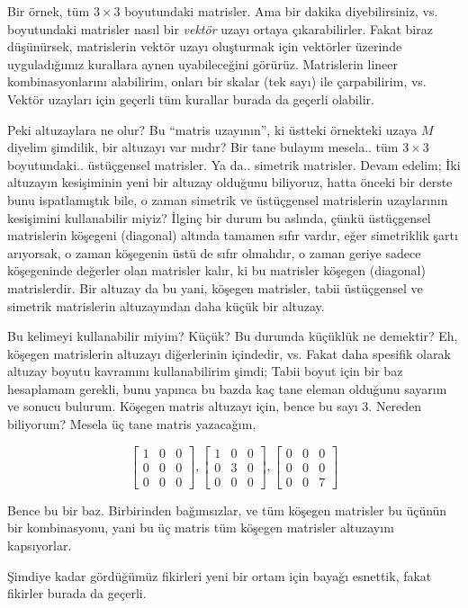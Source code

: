 \documentclass[12pt,fleqn]{article}\usepackage{../../common}
\begin{document}
Bir örnek, tüm $3 \times 3$ boyutundaki matrisler. Ama bir dakika
diyebilirsiniz, vs. boyutundaki matrisler nasıl bir {\em vektör} uzayı
ortaya çıkarabilirler. Fakat biraz düşünürsek, matrislerin vektör uzayı
oluşturmak için vektörler üzerinde uyguladığımız kurallara aynen
uyabileceğini görürüz. Matrislerin lineer kombinasyonlarını alabilirim,
onları bir skalar (tek sayı) ile çarpabilirim, vs. Vektör uzayları için
geçerli tüm kurallar burada da geçerli olabilir. 

Peki altuzaylara ne olur? Bu ``matris uzayının'', ki üstteki örnekteki
uzaya $M$ diyelim şimdilik, bir altuzayı var mıdır? Bir tane bulayım
mesela.. tüm $3 \times 3$ boyutundaki.. üstüçgensel matrisler. Ya da..
simetrik matrisler. Devam edelim; İki altuzayın kesişiminin yeni bir
altuzay olduğunu biliyoruz, hatta önceki bir derste bunu ispatlamıştık
bile, o zaman simetrik ve üstüçgensel matrislerin uzaylarının kesişimini
kullanabilir miyiz? İlginç bir durum bu aslında, çünkü üstüçgensel
matrislerin köşegeni (diagonal) altında tamamen sıfır vardır, eğer
simetriklik şartı arıyorsak, o zaman köşegenin üstü de sıfır olmalıdır, o
zaman geriye sadece köşegeninde değerler olan matrisler kalır, ki bu
matrisler köşegen (diagonal) matrislerdir. Bir altuzay da bu yani, köşegen
matrisler, tabii üstüçgensel ve simetrik matrislerin altuzayından daha
küçük bir altuzay. 

Bu kelimeyi kullanabilir miyim? Küçük? Bu durumda küçüklük ne demektir? Eh,
köşegen matrislerin altuzayı diğerlerinin içindedir, vs. Fakat daha
spesifik olarak altuzay boyutu kavramını kullanabilirim şimdi; Tabii boyut
için bir baz hesaplamam gerekli, bunu yapınca bu bazda kaç tane eleman
olduğunu sayarım ve sonucu bulurum. Köşegen matris altuzayı için, bence bu
sayı 3. Nereden biliyorum? Mesela üç tane matris yazacağım, 

$$ 
\left[\begin{array}{rrr}
1 & 0 & 0 \\
0 & 0 & 0 \\
0 & 0 & 0 
\end{array}\right], 
\left[\begin{array}{rrr}
1 & 0 & 0 \\
0 & 3 & 0 \\
0 & 0 & 0 
\end{array}\right], 
\left[\begin{array}{rrr}
0 & 0 & 0 \\
0 & 0 & 0 \\
0 & 0 & 7 
\end{array}\right]
 $$

Bence bu bir baz. Birbirinden bağımsızlar, ve tüm köşegen matrisler bu
üçünün bir kombinasyonu, yani bu üç matris tüm köşegen matrisler altuzayını
kapsıyorlar. 

Şimdiye kadar gördüğümüz fikirleri yeni bir ortam için bayağı esnettik,
fakat fikirler burada da geçerli. 
\end{document}
